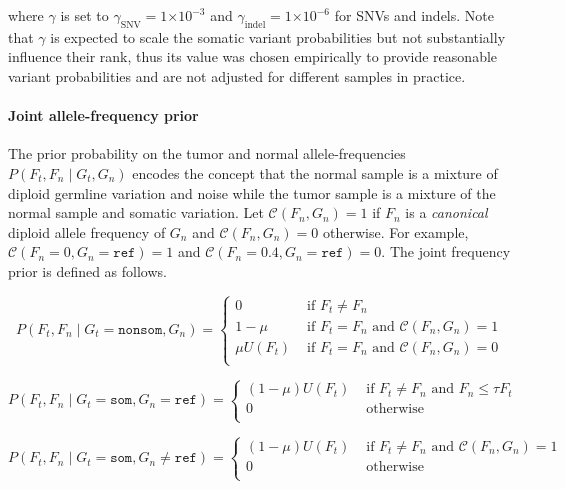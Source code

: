 \documentclass{article}
\newcommand{\e}[1]{\ensuremath{\times 10^{#1}}}
\begin{document}
\noindent where $\gamma$ is set to $\gamma_{\text{SNV}} = 1\e{-3}$ and $\gamma_{\text{indel}} = 1\e{-6}$ for SNVs and indels. Note that $\gamma$ is expected to scale the somatic variant probabilities but not substantially influence their rank, thus its value was chosen empirically to provide reasonable variant probabilities and are not adjusted for different samples in practice.


\paragraph{Joint allele-frequency prior}
The prior probability on the tumor and normal allele-frequencies $P(F_t, F_n \mid G_t, G_n)$ encodes the concept that the normal sample is a mixture of diploid germline variation and noise while the tumor sample is a mixture of the normal sample and somatic variation. Let $\mathcal{C} (F_n, G_n) = 1$ if $F_n$ is a {\em canonical} diploid allele frequency of $G_n$ and $\mathcal{C} (F_n, G_n) = 0$ otherwise. For example, $\mathcal{C} (F_n=0, G_n = \texttt{ref}) = 1$ and $\mathcal{C} (F_n=0.4, G_n = \texttt{ref}) = 0$. The joint frequency prior is defined as follows.

\begin{equation*}
P(F_t, F_n \mid G_t = \texttt{nonsom}, G_n)=
\begin{cases}
	0 & \text{ if } F_t \neq F_n \\
	1-\mu & \text{ if } F_t = F_n \text{ and }\mathcal{C}(F_n, G_n) = 1 \\
	\mu U(F_t) & \text{ if } F_t = F_n \text{ and }\mathcal{C}(F_n, G_n) = 0 \\
\end{cases}
\end{equation*}

\begin{equation*}
P(F_t, F_n \mid G_t = \texttt{som}, G_n = \texttt{ref})=
\begin{cases}
	(1-\mu)U(F_t) & \text{ if } F_t \neq F_n \text{ and } F_n \leq \tau F_t \\
	0 & \text{ otherwise } \\
\end{cases}
\end{equation*}

\begin{equation*}
P(F_t, F_n \mid G_t = \texttt{som}, G_n \neq \texttt{ref})=
\begin{cases}
	(1-\mu)U(F_t) & \text{ if } F_t \neq F_n \text{ and } \mathcal{C}(F_n, G_n) = 1 \\
	0 & \text{ otherwise } \\
\end{cases}
\end{equation*}
\end{document}
